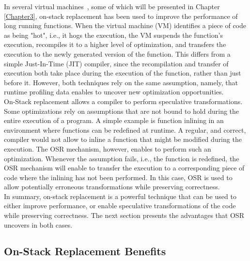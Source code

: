 In several virtual machines~\cite{paleczny2001java, lameed2013modular, holzle1992debugging, fink2003design, soman2006efficient, duboscq2014speculation, OSRKit, WebKitFTL}, some of which will be presented in Chapter \ref{Chapter3}, on-stack replacement has been used to improve the performance of long running functions.
When the virtual machine (VM) identifies a piece of code as being "hot", i.e., it hogs the execution, the VM suspends the function's execution, recompiles it to a higher level of optimization, and transfers the execution to the newly generated version of the function.
This differs from a simple Just-In-Time (JIT) compiler, since the recompilation and transfer of execution both take place during the execution of the function, rather than just before it.
However, both techniques rely on the same assumption, namely, that runtime profiling data enables to uncover new optimization opportunities.\\

On-Stack replacement allows a compiler to perform speculative transformations.
Some optimizations rely on assumptions that are not bound to hold during the entire execution of a program.
A simple example is function inlining in an environment where functions can be redefined at runtime.
A regular, and correct, compiler would not allow to inline a function that might be modified during the execution.
The OSR mechanism, however, enables to perform such an optimization.
Whenever the assumption fails, i.e., the function is redefined, the OSR mechanism will enable to transfer the execution to a corresponding piece of code where the inlining has not been performed.
In this case, OSR is used to allow potentially erroneous transformations while preserving correctness.\\

In summary, on-stack replacement is a powerful technique that can be used to either improve performance, or enable speculative transformations of the code while preserving correctness.
The next section presents the advantages that OSR uncovers in both cases.

\subsection{On-Stack Replacement Benefits}\label{WhyOSRInteresting}
    
